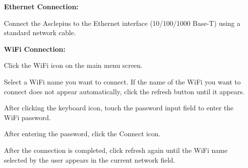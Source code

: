 \documentclass[11pt,a4paper]{article}
\begin{document}
\begin{tbkOperationTable}[caption={\str{tbl.console_buttons}},label=tbl:console-buttons]
\end{tbkOperationTable}

\begin{tbkTable}[caption={\str{tbl.additional_console}}]
\end{tbkTable}



\begin{tbkSteps}[prefix=Step]
  \item {}
  \item {}
  \item {}
\end{tbkSteps}




\textbf{Ethernet Connection:}

Connect the Asclepius to the Ethernet interface (10/100/1000 Base-T) using a
standard network cable.

\textbf{WiFi Connection:}

\begin{tbkSteps}
  \item Click the WiFi icon  on the main menu screen.
  \item Select a WiFi name you want to connect. If the name of the WiFi
        you want to connect does not appear automatically, click the
        refresh button  until it appears.
  \item After clicking the keyboard icon, touch the password input field
        to enter the WiFi password.
  \item After entering the password, click the Connect icon.
  \item After the connection is completed, click refresh again until the
        WiFi name selected by the user appears in the current network field.
\end{tbkSteps}
\end{document}
